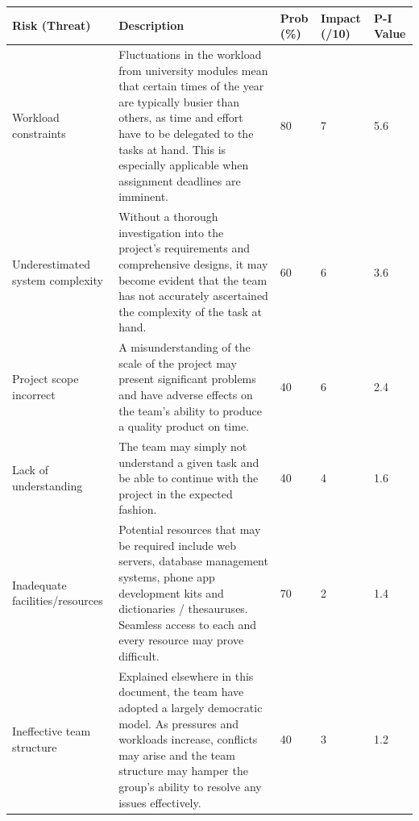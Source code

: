 \begin{table}[H]
	\centering
	\small
    \begin{tabular}{|p{2.5cm}|p{8.5cm}|p{1.2cm}|p{1.2cm}|p{1.2cm}|}
    \hline
    \textbf{Risk (Threat)} & \textbf{Description} & \textbf{Prob (\%)} & \textbf{Impact (/10)} & \textbf{P-I} Value \\ \hline
    Workload constraints              & Fluctuations in the workload from university modules mean that certain times of the year are typically busier than others, as time and effort have to be delegated to the tasks at hand. This is especially applicable when assignment deadlines are imminent. & 80              & 7            & 5.6       \\ \hline
    Underestimated system complexity & Without a thorough investigation into the project's requirements and comprehensive designs,  it may become evident that the team has not accurately ascertained the complexity of the task at hand.                                                            & 60              & 6            & 3.6       \\ \hline
    Project scope incorrect          & A misunderstanding of the scale of the project may present significant problems and have adverse effects on the team's ability to produce a quality product on time.                                                                                           & 40              & 6            & 2.4       \\ \hline
    Lack of understanding            & The team may simply not understand a given task and be able to continue with the project in the expected fashion.                                                                                                                                              & 40              & 4            & 1.6       \\ \hline
    Inadequate facilities/resources  & Potential resources that may be required include web servers, database management systems, phone app development kits and dictionaries / thesauruses. Seamless access to each and every resource may prove difficult.                                          & 70              & 2            & 1.4       \\ \hline
    Ineffective team structure      & Explained elsewhere in this document, the team have adopted a largely democratic model. As pressures and workloads increase, conflicts may arise and the team structure may hamper the group's ability to resolve any issues effectively.                      & 40              & 3            & 1.2       \\ \hline

\end{tabular}
\end{table}
